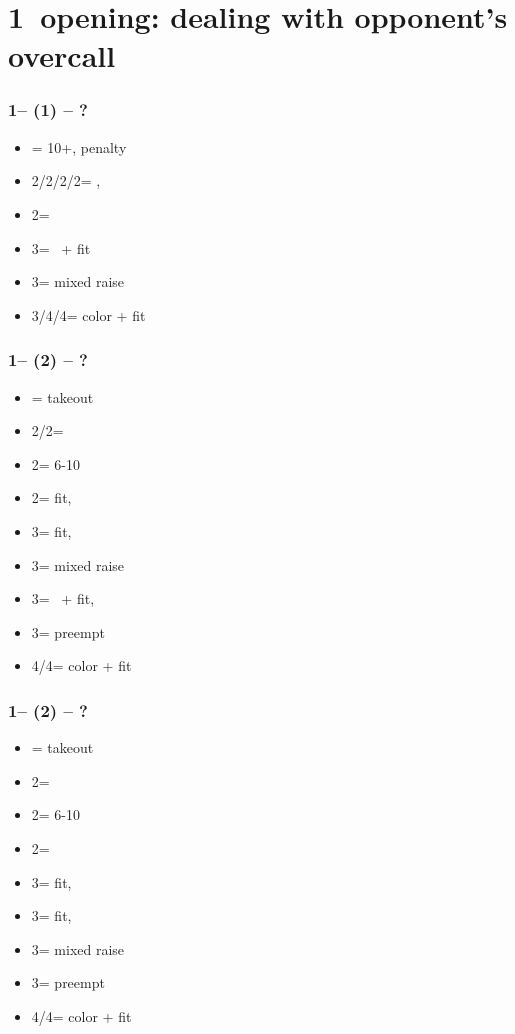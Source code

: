 \section{\texorpdfstring{1\spades\ opening: dealing with opponent's overcall}{oppsOvercallTfx1s}}\label{sec:oppsOvercallTfx1s}

\subsubsection*{1\spades -- (1\nt) -- ?}
\begin{itemize}
    \item \dbl = 10+, penalty
    \item 2\clubs/2\diams/2\hearts/2\spades = \nat, \nf
    \item 2\nt = \minor
    \item 3\clubs = \inv\ + fit
    \item 3\diams = mixed raise
    \item 3\hearts/4\clubs/4\diams = color + fit
\end{itemize}

\subsubsection*{1\spades -- (2\clubs) -- ?}
\begin{itemize}
    \item \dbl = takeout
    \item 2\diams/2\hearts = \fonce
    \item 2\spades = 6-10
    \item 2\nt = fit, \gf
    \item 3\clubs = fit, \inv
    \item 3\diams = mixed raise
    \item 3\hearts = \hearts\ + fit, \inv
    \item 3\spades = preempt
    \item 4\diams/4\hearts = color + fit
\end{itemize}

\subsubsection*{1\spades -- (2\diams) -- ?}
\begin{itemize}
    \item \dbl = takeout
    \item 2\hearts = \fonce
    \item 2\spades = 6-10
    \item 2\nt = \clubs\ \invp
    \item 3\clubs = fit, \gf
    \item 3\diams = fit, \inv
    \item 3\hearts = mixed raise
    \item 3\spades = preempt
    \item 4\clubs/4\hearts = color + fit
\end{itemize}

